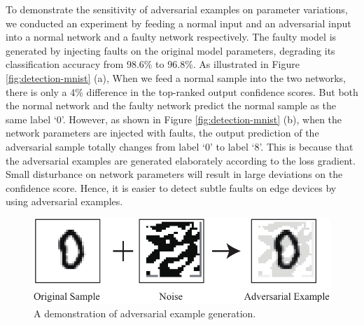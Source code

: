 To demonstrate the sensitivity of adversarial examples on parameter variations, we conducted an experiment by feeding a normal input and an adversarial input into a normal network and a faulty network respectively. The faulty model is generated by injecting faults on the original model parameters, degrading its classification accuracy from {98.6\%} to {96.8\%}. 
                                                                                                                                                        As illustrated in Figure \ref{fig:detection-mnist} (a), When we feed a normal sample into the two networks, there is only a {4\%} difference in the top-ranked output confidence scores. But both the normal network and the faulty network predict the normal sample as the same label `0'. However, as shown in Figure \ref{fig:detection-mnist} (b),  when the network parameters are injected with faults, the output prediction of the adversarial sample totally changes from label `0' to label `8'. This is because that the adversarial examples are generated elaborately according to the loss gradient. Small disturbance on network parameters will result in large deviations on the confidence score. Hence, it is easier to detect subtle faults on edge devices by using adversarial examples.
                                                                                                                                                            
\begin{figure}
    \centering
    \includegraphics[width=0.7\linewidth]{images/OL-fig5}
    \caption{A demonstration of adversarial example generation.}
    \label{fig:advexample} 
    \vspace {-15pt}
\end{figure}

